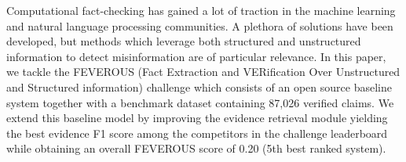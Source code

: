 Computational fact-checking has gained a lot of traction in the machine learning and natural language processing communities. A plethora of solutions have been developed, but methods which leverage both structured and unstructured information to detect misinformation are of particular relevance. In this paper, we tackle the FEVEROUS (Fact Extraction and VERification Over Unstructured and Structured information) challenge which consists of an open source baseline system together with a benchmark dataset containing 87,026 verified claims. We extend this baseline model by improving the evidence retrieval module yielding the best evidence F1 score among the competitors in the challenge leaderboard while obtaining an overall FEVEROUS score of 0.20 (5th best ranked system).

